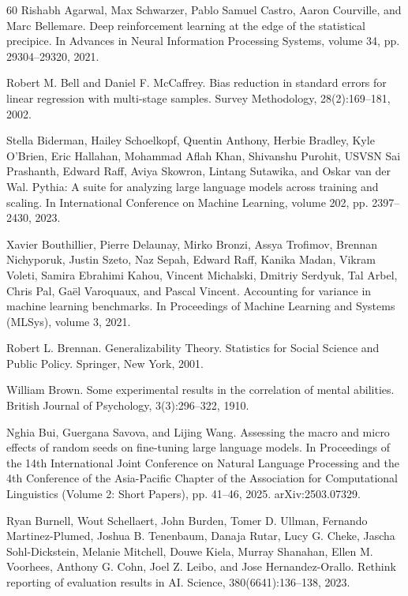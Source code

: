 \begin{thebibliography}{60}
Rishabh Agarwal, Max Schwarzer, Pablo Samuel Castro, Aaron Courville, and Marc Bellemare. Deep reinforcement learning at the edge of the statistical precipice. In Advances in Neural Information Processing Systems, volume 34, pp. 29304--29320, 2021.

Robert M. Bell and Daniel F. McCaffrey. Bias reduction in standard errors for linear regression with multi-stage samples. Survey Methodology, 28(2):169--181, 2002.

Stella Biderman, Hailey Schoelkopf, Quentin Anthony, Herbie Bradley, Kyle O'Brien, Eric Hallahan, Mohammad Aflah Khan, Shivanshu Purohit, USVSN Sai Prashanth, Edward Raff, Aviya Skowron, Lintang Sutawika, and Oskar van der Wal. Pythia: A suite for analyzing large language models across training and scaling. In International Conference on Machine Learning, volume 202, pp. 2397--2430, 2023.

Xavier Bouthillier, Pierre Delaunay, Mirko Bronzi, Assya Trofimov, Brennan Nichyporuk, Justin Szeto, Naz Sepah, Edward Raff, Kanika Madan, Vikram Voleti, Samira Ebrahimi Kahou, Vincent Michalski, Dmitriy Serdyuk, Tal Arbel, Chris Pal, Ga\"{e}l Varoquaux, and Pascal Vincent. Accounting for variance in machine learning benchmarks. In Proceedings of Machine Learning and Systems (MLSys), volume 3, 2021.

Robert L. Brennan. Generalizability Theory. Statistics for Social Science and Public Policy. Springer, New York, 2001.

William Brown. Some experimental results in the correlation of mental abilities. British Journal of Psychology, 3(3):296--322, 1910.

Nghia Bui, Guergana Savova, and Lijing Wang. Assessing the macro and micro effects of random seeds on fine-tuning large language models. In Proceedings of the 14th International Joint Conference on Natural Language Processing and the 4th Conference of the Asia-Pacific Chapter of the Association for Computational Linguistics (Volume 2: Short Papers), pp. 41--46, 2025. arXiv:2503.07329.

Ryan Burnell, Wout Schellaert, John Burden, Tomer D. Ullman, Fernando Martinez-Plumed, Joshua B. Tenenbaum, Danaja Rutar, Lucy G. Cheke, Jascha Sohl-Dickstein, Melanie Mitchell, Douwe Kiela, Murray Shanahan, Ellen M. Voorhees, Anthony G. Cohn, Joel Z. Leibo, and Jose Hernandez-Orallo. Rethink reporting of evaluation results in AI. Science, 380(6641):136--138, 2023.


\end{thebibliography}
